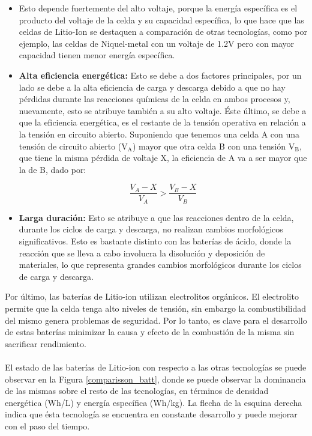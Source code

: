 \documentclass[10pt,a4paper]{article}
\begin{document}
\begin{itemize}
		\item \textbf{} Esto depende fuertemente del 
        alto voltaje, porque la energía específica es el producto del voltaje 
        de la celda y su capacidad específica, lo que hace que las celdas de 
        Litio-Ion se destaquen a comparación de otras tecnologías, 
        como por ejemplo, las celdas de Niquel-metal con un voltaje de 1.2V 
        pero con mayor capacidad tienen menor energía específica. 
		\item \textbf{Alta eficiencia energética:} Esto se debe a dos 
        factores principales, por un lado se debe a la alta eficiencia de 
        carga y descarga debido a que no hay pérdidas durante las reacciones 
        químicas de la celda en ambos procesos y, nuevamente, esto se atribuye 
        también a su alto voltaje. Éste último, se debe a que la eficiencia 
        energética, es el restante de la tensión operativa en relación a la 
        tensión en circuito abierto. Suponiendo que tenemos una celda A con una 
        tensión de circuito abierto ($\mathrm{V_A}$) mayor que otra celda B con 
        una tensión $\mathrm{V_B}$, que tiene la misma pérdida de voltaje X, 
        la eficiencia de A va a ser mayor que la de B, dado por:
		
		\clearpage
		\begin{equation}
			\frac{V_A - X}{V_A} > \frac{V_B - X}{V_B} \nonumber
		\end{equation}
		\item \textbf{Larga duración:} Esto se atribuye a que las reacciones 
        dentro de la celda, durante los ciclos de carga y descarga, no realizan 
        cambios morfológicos significativos. Esto es bastante distinto con las 
        baterías de ácido, donde la reacción que se lleva a cabo involucra la 
        disolución y deposición de materiales, lo que representa grandes 
        cambios morfológicos durante los ciclos de carga y descarga.
		
	\end{itemize}
	
	\noindent Por último, las baterías de Litio-ion utilizan electrolitos 
    orgánicos. El electrolito permite que la celda tenga alto niveles de 
    tensión, sin embargo la combustibilidad del mismo genera problemas de 
    seguridad. Por lo tanto, es clave para el desarrollo de estas baterías 
    minimizar la causa y efecto de la combustión de la misma sin sacrificar 
    rendimiento.\\
	\\
	\noindent El estado de las baterías de Litio-ion con respecto a las otras 
    tecnologías se puede observar en la Figura \ref{comparisson_batt}, donde se 
    puede observar la dominancia de las mismas sobre el resto de las 
    tecnologías, en términos de densidad energética (Wh/L) y energía específica 
    (Wh/kg). La flecha de la esquina derecha indica que ésta tecnología se 
    encuentra en constante desarrollo y puede mejorar con el paso del tiempo.
\end{document}

